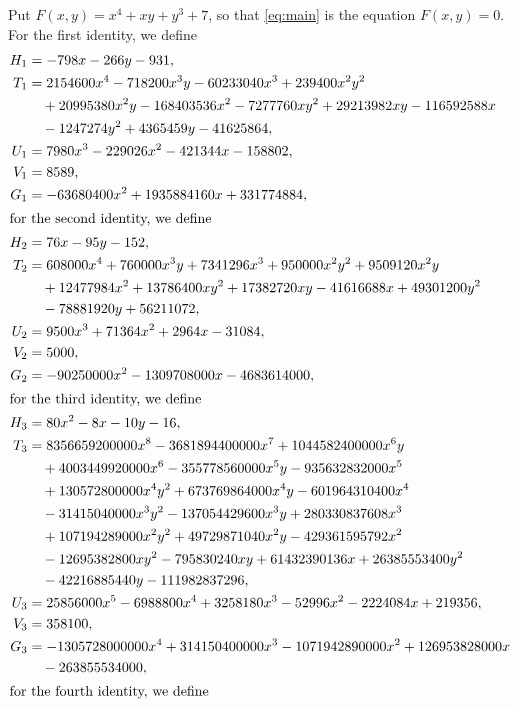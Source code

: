 \documentclass[11pt]{article}
\begin{document}
Put $F(x,y)=x^{4}+xy+y^{3}+7$, so that \eqref{eq:main} is the equation $F(x,y)=0$. For the first identity, we define
\begin{align*}
H_{1}&=-798x-266y-931,\\
T_{1}&=2154600x^{4}-718200x^{3}y-60233040x^{3}+239400x^{2}y^{2}\\
&\quad+20995380x^{2}y-168403536x^{2}-7277760xy^{2}+29213982xy-116592588x\\
&\quad-1247274y^{2}+4365459y-41625864,\\
U_{1}&=7980x^{3}-229026x^{2}-421344x-158802,\\
V_{1}&=8589,\\
G_{1}&=-63680400x^{2}+1935884160x+331774884,\\
\intertext{for the second identity, we define}
H_{2}&=76x-95y-152,\\
T_{2}&=608000x^{4}+760000x^{3}y+7341296x^{3}+950000x^{2}y^{2}+9509120x^{2}y\\
&\quad+12477984x^{2}+13786400xy^{2}+17382720xy-41616688x+49301200y^{2}\\
&\quad-78881920y+56211072,\\
U_{2}&=9500x^{3}+71364x^{2}+2964x-31084,\\
V_{2}&=5000,\\
G_{2}&=-90250000x^{2}-1309708000x-4683614000,\\
\intertext{for the third identity, we define}
H_{3}&=80x^{2}-8x-10y-16,\\
T_{3}&=8356659200000x^{8}-3681894400000x^{7}+1044582400000x^{6}y\\
&\quad+4003449920000x^{6}-355778560000x^{5}y-935632832000x^{5}\\
&\quad+130572800000x^{4}y^{2}+673769864000x^{4}y-601964310400x^{4}\\
&\quad-31415040000x^{3}y^{2}-137054429600x^{3}y+280330837608x^{3}\\
&\quad+107194289000x^{2}y^{2}+49729871040x^{2}y-429361595792x^{2}\\
&\quad-12695382800xy^{2}-795830240xy+61432390136x+26385553400y^{2}\\
&\quad-42216885440y-111982837296,\\
U_{3}&=25856000x^{5}-6988800x^{4}+3258180x^{3}-52996x^{2}-2224084x+219356,\\
V_{3}&=358100,\\
G_{3}&=-1305728000000x^{4}+314150400000x^{3}-1071942890000x^{2}+126953828000x\\
&\quad-263855534000,\\
\intertext{for the fourth identity, we define}

\end{align*}
\end{document}
